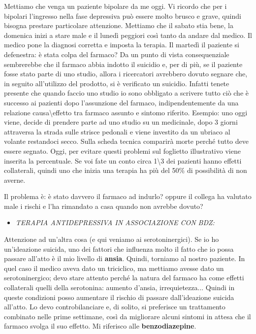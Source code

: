 \documentclass[]{article}
\begin{document}
Mettiamo che venga un paziente bipolare da me oggi. Vi ricordo che per i
bipolari l'ingresso nella fase depressiva può essere molto brusco e
grave, quindi bisogna prestare particolare attenzione. Mettiamo che il
sabato stia bene, la domenica inizi a stare male e il lunedì peggiori
così tanto da andare dal medico. Il medico pone la diagnosi corretta e
imposta la terapia. Il martedì il paziente si defenestra: è stata colpa
del farmaco? Da un punto di vista consequenziale sembrerebbe che il
farmaco abbia indotto il suicidio e, per di più, se il paziente fosse
stato parte di uno studio, allora i ricercatori avrebbero dovuto segnare
che, in seguito all'utilizzo del prodotto, si è verificato un suicidio.
Infatti tenete presente che quando faccio uno studio io sono obbligato a
scrivere tutto ciò che è successo ai pazienti dopo l'assunzione del
farmaco, indipendentemente da una relazione causa\textbackslash{}effetto
tra farmaco assunto e sintomo riferito. Esempio: uno oggi viene, decide
di prendere parte ad uno studio su un medicinale, dopo 3 giorni
attraversa la strada sulle strisce pedonali e viene investito da un
ubriaco al volante restandoci secco. Sulla scheda tecnica comparirà
morte perché tutto deve essere segnato. Oggi, per evitare questi
problemi sul foglietto illustrativo viene inserita la percentuale. Se
voi fate un conto circa 1\textbackslash{}3 dei pazienti hanno effetti
collaterali, quindi uno che inizia una terapia ha più del 50\% di
possibilità di non averne.

Il problema è: è stato davvero il farmaco ad indurlo? oppure il collega
ha valutato male i rischi e l'ha rimandato a casa quando non avrebbe
dovuto?

\begin{itemize}
\item
  \emph{TERAPIA ANTIDEPRESSIVA IN ASSOCIAZIONE CON BDZ:}
\end{itemize}

Attenzione ad un'altra cosa (e qui veniamo ai serotoninergici). Se io ho
un'ideazione suicida, uno dei fattori che influenza molto il fatto che
io possa passare all'atto è il mio livello di \textbf{ansia}. Quindi,
torniamo al nostro paziente. In quel caso il medico aveva dato un
triciclico, ma mettiamo avesse dato un serotoninergico; devo stare
attento perché la natura del farmaco ha come effetti collaterali quelli
della serotonina: aumento d'ansia, irrequietezza... Quindi in queste
condizioni posso aumentare il rischio di passare dall'ideazione suicida
all'atto. Lo devo controbilanciare e, di solito, si preferisce un
trattamento combinato nelle prime settimane, così da migliorare alcuni
sintomi in attesa che il farmaco svolga il suo effetto. Mi riferisco
alle \textbf{benzodiazepine}.
\end{document}

